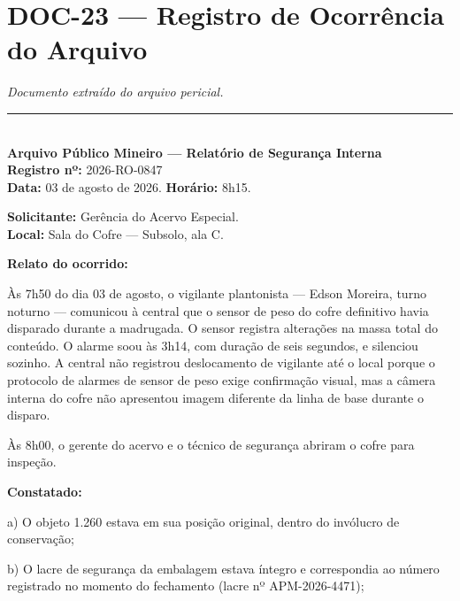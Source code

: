 \section*{\textbf{DOC-23} --- Registro de Ocorrência do Arquivo}

\noindent \textit{Documento extraído do arquivo pericial.}

\vspace{0.5em}\noindent\rule{\textwidth}{0.5pt}\vspace{0.5em}

\\[-0.2em]

\noindent \textbf{Arquivo Público Mineiro --- Relatório de Segurança Interna}\\
\noindent \textbf{Registro nº:} 2026-RO-0847\\
\noindent\textbf{Data:} 03 de agosto de 2026. \textbf{Horário:} 8h15.

\noindent \textbf{Solicitante:} Gerência do Acervo Especial.\\
\noindent \textbf{Local:} Sala do Cofre --- Subsolo, ala C.

\noindent \textbf{Relato do ocorrido:}

\noindent Às 7h50 do dia 03 de agosto, o vigilante plantonista --- Edson Moreira, turno noturno --- comunicou à central que o sensor de peso do cofre definitivo havia disparado durante a madrugada. O sensor registra alterações na massa total do conteúdo. O alarme soou às 3h14, com duração de seis segundos, e silenciou sozinho. A central não registrou deslocamento de vigilante até o local porque o protocolo de alarmes de sensor de peso exige confirmação visual, mas a câmera interna do cofre não apresentou imagem diferente da linha de base durante o disparo.

\noindent Às 8h00, o gerente do acervo e o técnico de segurança abriram o cofre para inspeção.

\noindent \textbf{Constatado:}

\noindent a) O objeto 1.260 estava em sua posição original, dentro do invólucro de conservação;

\noindent b) O lacre de segurança da embalagem estava íntegro e correspondia ao número registrado no momento do fechamento (lacre nº APM-2026-4471);

